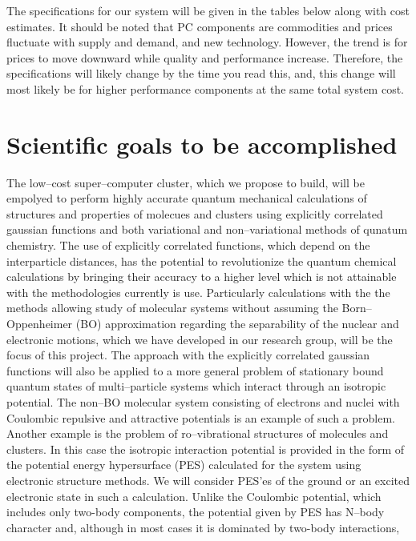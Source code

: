 The specifications for our system will be given in the tables below along with cost
estimates.  It should be noted that PC components are commodities and
prices fluctuate with supply and demand, and new technology. However,
the trend is for prices to move downward while quality and performance
increase. Therefore, the specifications will likely change by the time
you read this, and, this change will most likely be for higher
performance components at the same total system cost. 


\section{Scientific goals to be accomplished}



The low--cost super--computer cluster, 
which we propose to build, will
be empolyed to perform highly accurate quantum mechanical 
calculations of structures and properties of molecues
and clusters using explicitly correlated gaussian
functions and both variational and non--variational
methods of qunatum chemistry. 
The use of explicitly correlated functions, which
depend on the interparticle distances, has the
potential to revolutionize the quantum chemical
calculations by bringing their accuracy to a higher level
which is not
attainable with the methodologies currently is use.
Particularly 
calculations with the
the methods allowing study of molecular systems without
assuming the Born--Oppenheimer (BO) approximation regarding the
separability of the nuclear and electronic motions, which we have
developed in our research group,\cite{1,2,3,4}
will be the focus of this project.
The approach with the explicitly correlated
gaussian functions will also be applied to
a more general problem of stationary bound
quantum states of multi--particle
systems which interact through an isotropic potential.
The non--BO molecular system consisting of electrons and nuclei
with
Coulombic repulsive and attractive potentials
is an example of such a problem.
Another example
is the problem of ro--vibrational structures
of molecules and clusters.
In this case the isotropic interaction potential is provided
in the form of the potential energy hypersurface (PES)
calculated for the system using electronic structure methods.
We will consider PES'es of the
ground or an excited electronic state in such a calculation.
Unlike the Coulombic potential, which includes only two-body
components, the potential given by PES has N--body character and,
although in most cases it is dominated by two-body interactions,
